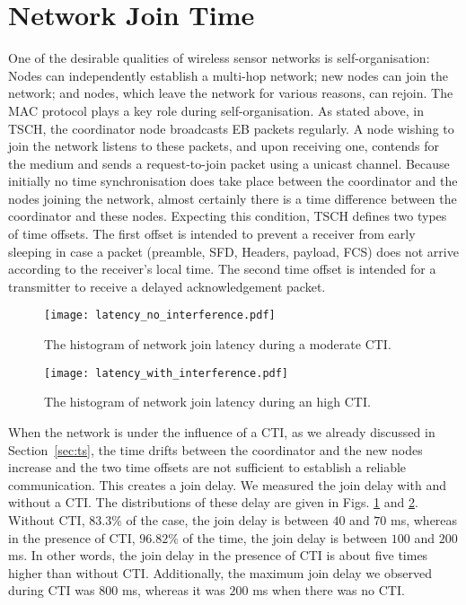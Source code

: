 \section{Network Join Time}
\label{sec:latency}
One of the desirable qualities of wireless sensor networks is self-organisation: Nodes can independently establish a multi-hop network; new nodes can join the network; and nodes, which leave the network for various reasons, can rejoin. The MAC protocol plays a key role during self-organisation. As stated above, in TSCH, the coordinator node broadcasts EB packets regularly. A node wishing to join the network listens to these packets, and upon receiving one, contends for the medium and sends a request-to-join packet using a unicast channel. Because initially no time synchronisation does take place between the coordinator and the nodes joining the network, almost certainly there is a time difference between the coordinator and these nodes. Expecting this condition, TSCH defines two types of time offsets. The first offset is intended to prevent a receiver from early sleeping in case a packet (preamble, SFD, Headers, payload, FCS) does not arrive according to the receiver's local time. The second time offset is intended for a transmitter to receive a delayed acknowledgement packet.

    \begin{figure}[h!]
        \centering
        \texttt{[image: latency\_no\_interference.pdf]}
        \caption{The histogram of network join latency during a moderate CTI.}
        \label{fig: latency_with_interference}
    \end{figure}  
            
    
    \begin{figure}[h!]
        \centering
        \texttt{[image: latency\_with\_interference.pdf]}
        \caption{The histogram of network join latency during an high CTI.}
        \label{fig: latency_no_interference}
    \end{figure}  

When the network is under the influence of a CTI, as we already discussed in Section~\ref{sec:ts}, the time drifts between the coordinator and the new nodes increase and the two time offsets are not sufficient to establish a reliable communication. This creates a join delay. We measured the join delay with and without a CTI. The distributions of these delay are given in Figs. \ref{fig: latency_with_interference} and \ref{fig: latency_no_interference}.   Without CTI, $83.3\%$  of the case, the join delay  is between $40$ and $70$ ms, whereas in the presence of CTI, $96.82\%$ of the time, the join delay is between $100$ and $200$ ms. In other words, the join delay in the presence of CTI is about five times higher than without CTI. Additionally, the maximum join delay we observed during CTI was $800$ ms, whereas it was $200$ ms when there was no CTI.     